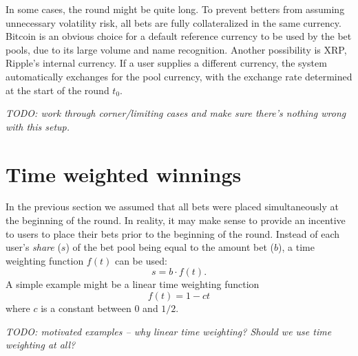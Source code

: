 \documentclass[floatfix,reprint,nofootinbib,amsmath,amssymb,epsfig,pre,floats,letterpaper,groupedaffiliation]{revtex4-1}
\newcommand{\beq}{\begin{equation}}
\newcommand{\eeq}{\end{equation}}
\begin{document}
In some cases, the round might be quite long.  To prevent betters from assuming unnecessary volatility risk, all bets are fully collateralized in the same currency.  Bitcoin is an obvious choice for a default reference currency to be used by the bet pools, due to its large volume and name recognition.  Another possibility is XRP, Ripple's internal currency.  If a user supplies a different currency, the system automatically exchanges for the pool currency, with the exchange rate determined at the start of the round $t_0$.

\emph{TODO: work through corner/limiting cases and make sure there's nothing wrong with this setup.}

\section*{Time weighted winnings}

In the previous section we assumed that all bets were placed simultaneously at the beginning of the round.  In reality, it may make sense to provide an incentive to users to place their bets prior to the beginning of the round.  Instead of each user's \emph{share} ($s$) of the bet pool being equal to the amount bet ($b$), a time weighting function $f(t)$ can be used:
\beq
s = b \cdot f(t).
\eeq
A simple example might be a linear time weighting function
\beq
f(t) = 1-ct
\eeq
where $c$ is a constant between 0 and $1/2$.

\emph{TODO: motivated examples -- why linear time weighting?  Should we use time weighting at all?}

%
%
\end{document}
